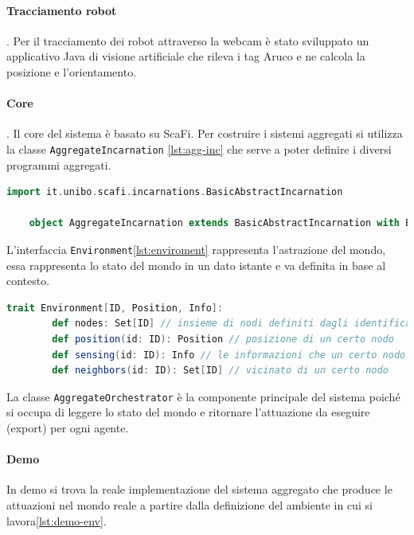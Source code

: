\documentclass[12pt,a4paper,openright,twoside]{book}
\begin{document}
\paragraph{Tracciamento robot}.
Per il tracciamento dei robot attraverso la webcam è stato sviluppato un applicativo Java di visione artificiale che rileva i tag Aruco e ne calcola la posizione e l'orientamento.

\paragraph{Core}. 
Il core del sistema è basato su ScaFi.
Per costruire i sistemi aggregati si utilizza la classe \verb|AggregateIncarnation| \cref{lst:agg-inc} che serve a poter definire i diversi programmi aggregati.

\begin{lstlisting}[language=Scala, label={lst:agg-inc}, caption={Classe AggregateIncarnation}]
    import it.unibo.scafi.incarnations.BasicAbstractIncarnation

    object AggregateIncarnation extends BasicAbstractIncarnation with BuildingBlocks
\end{lstlisting}

L'interfaccia \verb|Environment|\cref{lst:enviroment} rappresenta l'astrazione del mondo, essa rappresenta lo stato del mondo in un dato istante e va definita in base al contesto.

\begin{lstlisting}[language=Scala, label={lst:enviroment}, caption={Interfaccia Enviroment}]
    trait Environment[ID, Position, Info]:
        def nodes: Set[ID] // insieme di nodi definiti dagli identificatori ID
        def position(id: ID): Position // posizione di un certo nodo
        def sensing(id: ID): Info // le informazioni che un certo nodo espone
        def neighbors(id: ID): Set[ID] // vicinato di un certo nodo
\end{lstlisting}

La classe \verb|AggregateOrchestrator| è la componente principale del sistema poiché si occupa di leggere lo stato del mondo e ritornare l'attuazione da eseguire (export) per ogni agente.

\paragraph{Demo}
In demo si trova la reale implementazione del sistema aggregato che produce le attuazioni nel mondo reale a partire dalla definizione del ambiente in cui si lavora\cref{lst:demo-env}.
\end{document}
